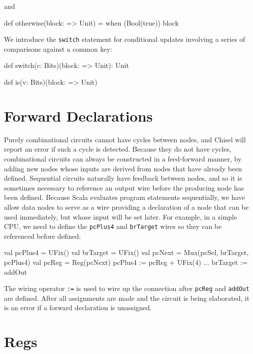 \documentclass[10pt,twocolumn]{article}
\def\code#1{{\small\tt #1}}
\begin{document}
\begin{scala}
def unless(c: Bool)(block: => Unit) = 
  when (!c) { block )
\end{scala}

\noindent 
and

\begin{scala}
def otherwise(block: => Unit) = 
  when (Bool(true)) { block }
\end{scala}

We introduce the \code{switch} statement for conditional updates
involving a series of comparisons against a common key:

\begin{scala}
def switch(c: Bits)(block: => Unit): Unit

def is(v: Bits)(block: => Unit)
\end{scala}

\section{Forward Declarations}

Purely combinational circuits cannot have cycles between nodes, and
Chisel will report an error if such a cycle is detected.  Because they
do not have cycles, combinational circuits can always be constructed
in a feed-forward manner, by adding new nodes whose inputs are derived
from nodes that have already been defined.  Sequential circuits
naturally have feedback between nodes, and so it is sometimes
necessary to reference an output wire before the producing node has
been defined.  Because Scala evaluates program statements
sequentially, we have allow data nodes to serve as a wire providing
a declaration of a node that can be used immediately, but whose
input will be set later.  
For example, in a simple CPU, we need to define the \verb!pcPlus4!
and \verb!brTarget! wires so they can be referenced before defined:
\begin{scala}
val pcPlus4  = UFix()
val brTarget = UFix()
val pcNext   = Mux(pcSel, brTarget, pcPlus4)
val pcReg    = Reg(pcNext)
pcPlus4     := pcReg + UFix(4)
...
brTarget    := addOut
\end{scala}

\noindent
The wiring operator
\verb!:=! is used to wire up
the connection after \verb!pcReg! and \verb!addOut! are defined.
After all assignments are made and the circuit is being elaborated, 
it is an error if a forward declaration is unassigned.

\section{Regs}
\end{document}

